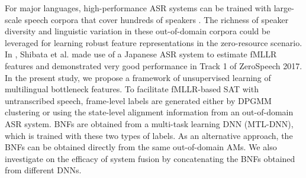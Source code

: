 \documentclass[a4paper]{article}
\begin{document}
For major languages, high-performance ASR systems can be trained with large-scale speech corpora that cover hundreds of speakers \cite{paul1992design,LeeLoChingEtAl2002}. The richness of speaker diversity and linguistic variation in these out-of-domain corpora could be leveraged for learning robust feature representations in the zero-resource scenario. In \cite{shibata2017composite}, Shibata et al. made use of a Japanese ASR system to estimate fMLLR features and demonstrated very good performance in Track 1 of ZeroSpeech 2017. 
In the present study, we propose a framework of unsupervised learning of multilingual bottleneck features. To facilitate fMLLR-based SAT with untranscribed speech, frame-level labels are generated either by DPGMM clustering or using the state-level alignment information from an out-of-domain ASR system. BNFs are obtained from a multi-task learning DNN (MTL-DNN), which is trained with these two types of labels. As an alternative approach, the BNFs can be obtained directly from the same out-of-domain AMs. We also investigate on the efficacy of system fusion by concatenating the BNFs obtained from different DNNs.
\end{document}
